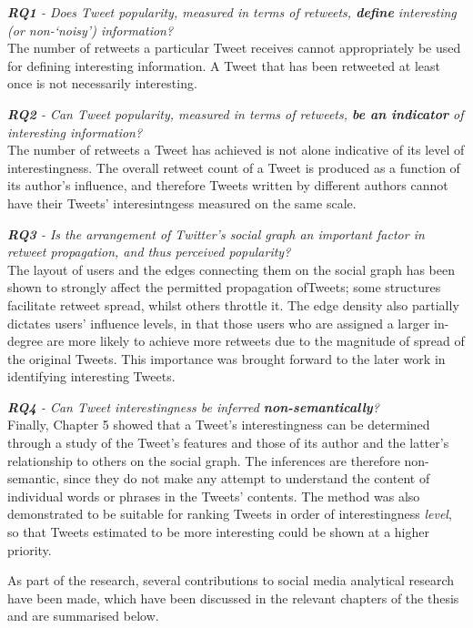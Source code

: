 \textit{\textbf{RQ1} - Does Tweet popularity, measured in terms of retweets, \textbf{define} interesting (or non-`noisy') information?}\\
The number of retweets a particular Tweet receives cannot appropriately be used for defining interesting information. A Tweet that has been retweeted at least once is not necessarily interesting.

\textit{\textbf{RQ2} - Can Tweet popularity, measured in terms of retweets, \textbf{be an indicator} of interesting information?}\\
The number of retweets a Tweet has achieved is not alone indicative of its level of interestingness. The overall retweet count of a Tweet is produced as a function of its author's influence, and therefore Tweets written by different authors cannot have their Tweets' interesintngess measured on the same scale.

\textit{\textbf{RQ3} - Is the arrangement of Twitter's social graph an important factor in retweet propagation, and thus perceived popularity?}\\
The layout of users and the edges connecting them on the social graph has been shown to strongly affect the permitted propagation ofTweets; some structures facilitate retweet spread, whilst others throttle it. The edge density also partially dictates users' influence levels, in that those users who are assigned a larger in-degree are more likely to achieve more retweets due to the magnitude of spread of the original Tweets. This importance was brought forward to the later work in identifying interesting Tweets.

\textit{\textbf{RQ4} - Can Tweet interestingness be inferred \textbf{non-semantically}?}\\
Finally, Chapter 5 showed that a Tweet's interestingness can be determined through a study of the Tweet's features and those of its author and the latter's relationship to others on the social graph. The inferences are therefore non-semantic, since they do not make any attempt to understand the content of individual words or phrases in the Tweets' contents. The method was also demonstrated to be suitable for ranking Tweets in order of interestingness \textit{level}, so that Tweets estimated to be more interesting could be shown at a higher priority.

As part of the research, several contributions to social media analytical research have been made, which have been discussed in the relevant chapters of the thesis and are summarised below. 

